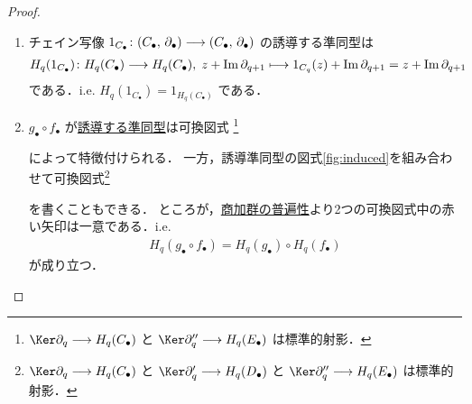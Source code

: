 \documentclass[algtopo_main]{subfiles}
\begin{document}
\begin{proof}
    \begin{enumerate}
        \item 
        チェイン写像 $1_{C_\bullet} \colon (C_\bullet,\, \partial_\bullet) \longrightarrow (C_\bullet,\, \partial_\bullet)$ の誘導する準同型は
        \begin{align}
            H_q(1_{C_\bullet}) \colon H_q(C_\bullet) \longrightarrow H_q(C_\bullet),\; z + \Im \partial_{q+1} \longmapsto 1_{C_q}(z) + \Im \partial_{q+1} = z + \Im \partial_{q+1}
        \end{align}
        である．i.e. $H_q(1_{C_\bullet} ) = 1_{H_q(C_\bullet)}$ である．
        \item 
        $g_\bullet \circ f_\bullet$ が\hyperref[def:induced-chain]{誘導する準同型}は可換図式
        \footnote{$\Ker \partial_q \lto H_q(C_\bullet)$ と $\Ker \partial''_q \lto H_q(E_\bullet)$ は標準的射影．}
        \begin{center}
        \end{center}
        によって特徴付けられる．
        一方，誘導準同型の図式\ref{fig:induced}を組み合わせて可換図式\footnote{$\Ker \partial_q \lto H_q(C_\bullet)$ と $\Ker \partial'_q \lto H_q(D_\bullet)$ と $\Ker \partial''_q \lto H_q(E_\bullet)$ は標準的射影．}
        \begin{center}
        \end{center}
        を書くこともできる．
        ところが，\hyperref[lem:quomod-univ]{商加群の普遍性}より2つの可換図式中の赤い矢印は一意である．i.e.
        \begin{align}
            H_q (g_\bullet \circ f_\bullet) = H_q(g_\bullet) \circ H_q(f_\bullet)
        \end{align}
        が成り立つ．
    \end{enumerate}
\end{proof}
\end{document}
